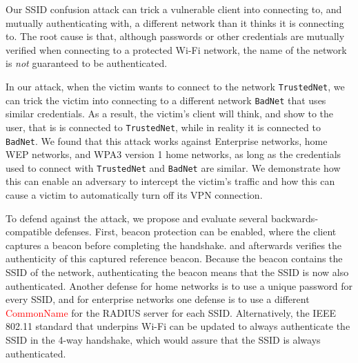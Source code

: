 \documentclass[sigconf,review,anonymous]{acmart}
\newcommand{\wifi}{\mbox{Wi-Fi}}
\newcommand{\fourway}{\mbox{4-way}}
\DeclareRobustCommand{\red}[1]{\textcolor{red}{#1}}
\begin{document}
Our SSID confusion attack can trick a vulnerable client into connecting to, and mutually authenticating with, a different network than it thinks it is connecting to.
The root cause is that, although passwords or other credentials are mutually verified when connecting to a protected \wifi{} network, the name of the network is \emph{not} guaranteed to be authenticated.

In our attack, when the victim wants to connect to the network \verb|TrustedNet|, we can trick the victim into connecting to a different network \verb|BadNet| that uses similar credentials.
As a result, the victim's client will think, and show to the user, that is is connected to \verb|TrustedNet|, while in reality it is connected to \verb|BadNet|.
We found that this attack works against Enterprise networks, home WEP networks, and WPA3 version 1 home networks, as long as the credentials used to connect with \verb|TrustedNet| and \verb|BadNet| are similar.
We demonstrate how this can enable an adversary to intercept the victim's traffic and how this can cause a victim to automatically turn off its VPN connection.

To defend against the attack, we propose and evaluate several backwards-compatible defenses.
First, beacon protection can be enabled, where the client captures a beacon before completing the handshake. and afterwards verifies the authenticity of this captured reference beacon.
Because the beacon contains the SSID of the network, authenticating the beacon means that the SSID is now also authenticated.
Another defense for home networks is to use a unique password for every SSID, and for enterprise networks one defense is to use a different \red{CommonName} for the RADIUS server for each SSID.
Alternatively, the IEEE 802.11 standard that underpins \wifi{} can be updated to always authenticate the SSID in the \fourway{} handshake, which would assure that the SSID is always authenticated.
\end{document}
